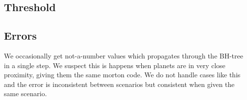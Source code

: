 \begin{Figure}
  \centering
\lstset{firstnumber=41}

\end{Figure}

\subsection{Threshold}

\subsection{Errors}\label{sec:errors}
We occasionally get not-a-number values which propagates through the BH-tree in
a single step. We suspect this is happens when planets are in very close
proximity, giving them the same morton code. We do not handle cases like this
and the error is inconsistent between scenarios but consistent when given the
same scenario.

